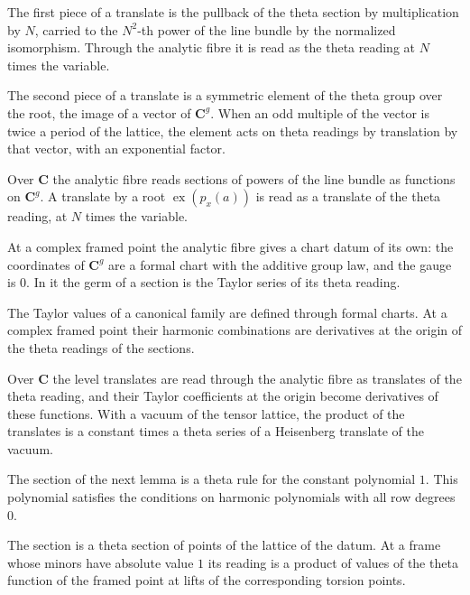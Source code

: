 The first piece of a translate is the pullback of the theta section by multiplication by $N$, carried to the
$N^2$-th power of the line bundle by the normalized isomorphism. Through the analytic fibre it is read as the theta
reading at $N$ times the variable.

The second piece of a translate is a symmetric element of the theta group over the root, the image of a vector of
$\mathbf C^g$. When an odd multiple of the vector is twice a period of the lattice, the element acts on theta readings
by translation by that vector, with an exponential factor.

Over $\mathbf C$ the analytic fibre reads sections of powers of the line bundle as functions on $\mathbf C^g$. A
translate by a root $\operatorname{ex}(p_x(a))$ is read as a translate of the theta reading, at $N$ times the variable.

At a complex framed point the analytic fibre gives a chart datum of its own: the coordinates of $\mathbf C^g$ are a
formal chart with the additive group law, and the gauge is $0$. In it the germ of a section is the Taylor series of
its theta reading.

The Taylor values of a canonical family are defined through formal charts. At a complex framed point their harmonic
combinations are derivatives at the origin of the theta readings of the sections.

Over $\mathbf C$ the level translates are read through the analytic fibre as translates of the theta reading, and
their Taylor coefficients at the origin become derivatives of these functions. With a vacuum of the tensor lattice,
the product of the translates is a constant times a theta series of a Heisenberg translate of the vacuum.

The section of the next lemma is a theta rule for the constant polynomial $1$. This polynomial satisfies the
conditions on harmonic polynomials with all row degrees $0$.

The section is a theta section of points of the lattice of the datum. At a frame whose minors have absolute value
$1$ its reading is a product of values of the theta function of the framed point at lifts of the corresponding
torsion points.

